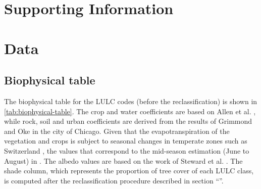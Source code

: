 \documentclass[10pt,letterpaper]{article}
\begin{document}
\section*{Supporting Information}

\setcounter{figure}{0}
\renewcommand{\thefigure}{S\arabic{figure}}
\setcounter{table}{0}
\renewcommand{\thetable}{S\arabic{table}}

\section*{Data}

\subsection*{Biophysical table}
\label{sec:biophysical-table}

The biophysical table for the LULC codes (before the reclassification) is shown in \autoref{tab:biophysical-table}. The crop and water coefficients are based on Allen et al. \cite{allen1998crop}, while rock, soil and urban coefficients are derived from the results of Grimmond and Oke \cite{grimmond1999evapotranspiration} in the city of Chicago. Given that the evapotranspiration of the vegetation and crops is subject to seasonal changes in temperate zones such as Switzerland \cite{allen1998crop}, the values that correspond to the mid-season estimation (June to August) in \cite{nistor2016mapping}.
The albedo values are based on the work of Steward et al. \cite{stewart2012local}.
The shade column, which represents the proportion of tree cover of each LULC class, is computed after the reclassification procedure described in section ``''. %
\end{document}
